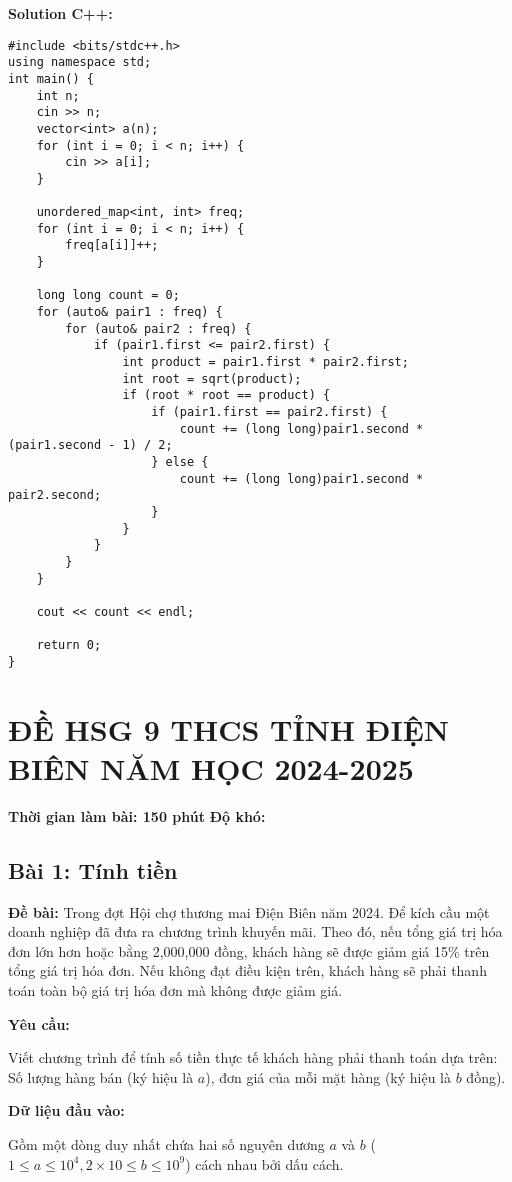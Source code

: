\documentclass[12pt]{scrartcl}  %
\begin{document}
\textbf{Solution C++:}
\begin{lstlisting}
#include <bits/stdc++.h>
using namespace std;
int main() {
    int n;
    cin >> n;
    vector<int> a(n);
    for (int i = 0; i < n; i++) {
        cin >> a[i];
    }
    
    unordered_map<int, int> freq;
    for (int i = 0; i < n; i++) {
        freq[a[i]]++;
    }
    
    long long count = 0;
    for (auto& pair1 : freq) {
        for (auto& pair2 : freq) {
            if (pair1.first <= pair2.first) {
                int product = pair1.first * pair2.first;
                int root = sqrt(product);
                if (root * root == product) {
                    if (pair1.first == pair2.first) {
                        count += (long long)pair1.second * (pair1.second - 1) / 2;
                    } else {
                        count += (long long)pair1.second * pair2.second;
                    }
                }
            }
        }
    }
    
    cout << count << endl;
    
    return 0;
}
\end{lstlisting}

\section{ĐỀ HSG 9 THCS TỈNH ĐIỆN BIÊN NĂM HỌC 2024-2025}
\textbf{Thời gian làm bài: 150 phút}
\textbf{Độ khó: }
\subsection{Bài 1: Tính tiền}
\textbf{Đề bài:}
Trong đợt Hội chợ thương mai Điện Biên năm 2024. Để kích cầu một doanh nghiệp đã đưa ra chương trình khuyến mãi. Theo đó, nếu tổng giá trị hóa đơn lớn hơn hoặc bằng 2,000,000 đồng, khách hàng sẽ được giảm giá 15\% trên tổng giá trị hóa đơn. Nếu không đạt điều kiện trên, khách hàng sẽ phải thanh toán toàn bộ giá trị hóa đơn mà không được giảm giá.

\textbf{Yêu cầu:}

Viết chương trình để tính số tiền thực tế khách hàng phải thanh toán dựa trên: Số lượng hàng bán (ký hiệu là $a$), đơn giá của mỗi mặt hàng (ký hiệu là $b$ đồng).

\textbf{Dữ liệu đầu vào:}

Gồm một dòng duy nhất chứa hai số nguyên dương $a$ và $b$ ($1 \leq a \leq 10^4,2 \times 10 \leq b \leq 10^9$) cách nhau bởi dấu cách.
\end{document}
